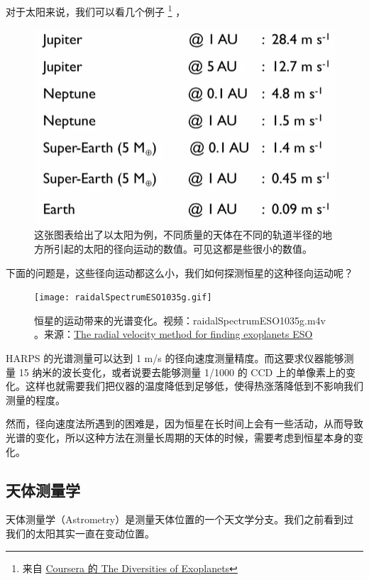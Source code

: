 \documentclass[letterpaper,10pt,english]{sphinxmanual}
\begin{document}
对于太阳来说，我们可以看几个例子 \footnote{
来自 \href{https://class.coursera.org/extrasolarplanets-001}{Coursera 的 The Diversities of Exoplanets}
} ，
\begin{figure}[htbp]
\centering
\capstart

\includegraphics{radialVelocitySolar.png}
\caption{这张图表给出了以太阳为例，不同质量的天体在不同的轨道半径的地方所引起的太阳的径向运动的数值。可见这都是些很小的数值。}\end{figure}

下面的问题是，这些径向运动都这么小，我们如何探测恒星的这种径向运动呢？
\begin{figure}[htbp]
\centering
\capstart

\texttt{[image: raidalSpectrumESO1035g.gif]}
\caption{恒星的运动带来的光谱变化。视频：raidalSpectrumESO1035g.m4v 。来源：\href{http://www.eso.org/public/usa/videos/eso1035g/}{The radial velocity method for finding exoplanets \textbar{} ESO}}\end{figure}

HARPS 的光谱测量可以达到 1 m/s 的径向速度测量精度。而这要求仪器能够测量 15 纳米的波长变化，或者说要去能够测量 1/1000 的 CCD 上的单像素上的变化。这样也就需要我们把仪器的温度降低到足够低，使得热涨落降低到不影响我们测量的程度。

然而，径向速度法所遇到的困难是，因为恒星在长时间上会有一些活动，从而导致光谱的变化，所以这种方法在测量长周期的天体的时候，需要考虑到恒星本身的变化。


\subsection{天体测量学}
\label{detection:id4}\label{detection:index-3}
天体测量学（Astrometry）是测量天体位置的一个天文学分支。我们之前看到过我们的太阳其实一直在变动位置。
\end{document}
